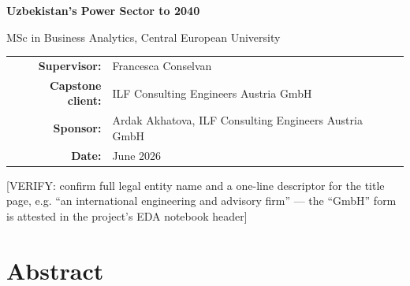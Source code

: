 \documentclass[10pt,twocolumn]{article}
\newcommand{\mk}[1]{{\color{amber}\small #1}}
\begin{document}
\pagestyle{empty}\onecolumn
\begin{center}\vspace*{0.9in}
{\color{navy}\Huge\bfseries Uzbekistan's Power Sector to 2040\par}
\vspace{12pt}{\large\itshape Forecasting Demand, Bounding Uncertainty, and Locating Advisory Opportunity\par}
\vspace{5pt}MSc in Business Analytics, Central European University\par
\vspace{0.5in}
\begin{tabular}{r@{\quad}l}
\textbf{Supervisor:} & Francesca Conselvan\\[3pt]
\textbf{Capstone client:} & ILF Consulting Engineers Austria GmbH\\[3pt]
\textbf{Sponsor:} & Ardak Akhatova, ILF Consulting Engineers Austria GmbH\\[3pt]
\textbf{Date:} & June 2026\\
\end{tabular}\par
\vspace{12pt}
{\footnotesize \mk{[VERIFY: confirm full legal entity name and a one-line descriptor for the title page, e.g. ``an international engineering and advisory firm'' --- the ``GmbH'' form is attested in the project's EDA notebook header]}\par}
\end{center}\clearpage
{}\section*{Abstract}
\end{document}
